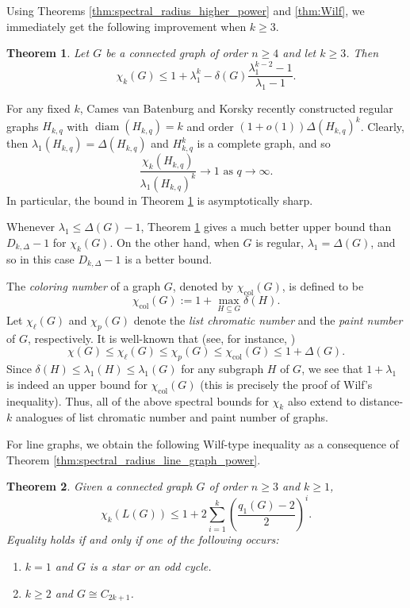 \documentclass[10pt,a4paper]{article}
\theoremstyle{plain}
\newtheorem{theorem}{Theorem}[section]
\numberwithin{equation}{section}
\DeclareMathOperator{\diam}{diam}
\DeclareMathOperator{\col}{col}
\begin{document}
Using Theorems \ref{thm:spectral_radius_higher_power} and \ref{thm:Wilf}, we immediately get the following improvement when $k\ge 3$. 

\begin{theorem}\label{thm:wilf_graph_power_improved}
     Let $G$ be a connected graph of order $n\ge 4$ and let $k\ge 3$. Then
     \[\chi_k(G) \le 1 + \lambda_1^k - \delta(G)\frac{\lambda_1^{k-2}-1}{\lambda_1 -1}.\]
\end{theorem}

For any fixed $k$, Cames van Batenburg and Korsky \cite{vanBatenburg_Korsky_2026} recently constructed regular graphs $H_{k,q}$ with $\diam(H_{k,q}) = k$ and order $(1+o(1))\Delta(H_{k,q})^k$. Clearly, then $\lambda_1(H_{k,q}) = \Delta(H_{k,q})$ and $H_{k,q}^k$ is a complete graph, and so 
\[ \frac{\chi_k(H_{k,q})}{\lambda_1(H_{k,q})^k}\to 1 \text{ as }q\to \infty.\]
In particular, the bound in Theorem \ref{thm:wilf_graph_power_improved} is asymptotically sharp.

Whenever $\lambda_1 \le \Delta(G)-1$, Theorem \ref{thm:wilf_graph_power_improved} gives a much better upper bound than $D_{k, \Delta} - 1$ for $\chi_k(G)$. On the other hand, when $G$ is regular, $\lambda_1 = \Delta(G)$, and so in this case $D_{k, \Delta}-1$ is a better bound. 

The \emph{coloring number} of a graph $G$, denoted by $\chi_{\col}(G)$, is defined to be 
\[ \chi_{\col}(G):= 1 + \max_{H\subseteq G}\delta(H).\]
Let $\chi_\ell(G)$ and $\chi_p(G)$ denote the \emph{list chromatic number} and the \emph{paint number} of $G$, respectively. It is well-known that (see, for instance, \cite{Cranston_2023})
\[ \chi(G)\le \chi_\ell(G)\le \chi_p(G)\le \chi_{\col}(G)\le 1 + \Delta(G).\]
Since $\delta(H)\le \lambda_1(H)\le \lambda_1(G)$ for any subgraph $H$ of $G$, we see that $1 + \lambda_1$ is indeed an upper bound for $\chi_{\col}(G)$ (this is precisely the proof of Wilf's inequality). Thus, all of the above spectral bounds for $\chi_k$ also extend to distance-$k$ analogues of list chromatic number and paint number of graphs. 

For line graphs, we obtain the following Wilf-type inequality as a consequence of Theorem \ref{thm:spectral_radius_line_graph_power}. 

\begin{theorem}\label{thm:wilf_line_graph power}
Given a connected graph $G$ of order $n\ge 3$ and $k\ge 1$, 
 \[ \chi_k(L(G))\le 1 + 2\sum_{i=1}^k \left(\frac{q_1(G)-2}{2}\right)^i.\] 
Equality holds if and only if one of the following occurs:
\begin{enumerate}[$(i)$]
    \item $k=1$ and $G$ is a star or an odd cycle. 
    \item $k\ge 2$ and $G\cong C_{2k+1}$. 
\end{enumerate}
\end{theorem}
\end{document}
